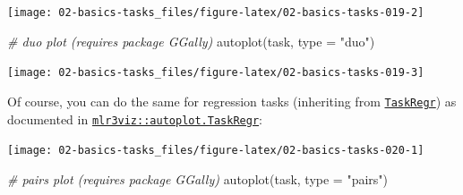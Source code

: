 \documentclass[
]{scrbook}
\newenvironment{Shaded}{\begin{snugshade}}{\end{snugshade}}
\newcommand{\AttributeTok}[1]{\textcolor[rgb]{0.77,0.63,0.00}{#1}}
\newcommand{\CommentTok}[1]{\textcolor[rgb]{0.56,0.35,0.01}{\textit{#1}}}
\newcommand{\DecValTok}[1]{\textcolor[rgb]{0.00,0.00,0.81}{#1}}
\newcommand{\FunctionTok}[1]{\textcolor[rgb]{0.00,0.00,0.00}{#1}}
\newcommand{\NormalTok}[1]{#1}
\newcommand{\OtherTok}[1]{\textcolor[rgb]{0.56,0.35,0.01}{#1}}
\newcommand{\SpecialCharTok}[1]{\textcolor[rgb]{0.00,0.00,0.00}{#1}}
\newcommand{\StringTok}[1]{\textcolor[rgb]{0.31,0.60,0.02}{#1}}
\renewenvironment{Shaded} {\begin{snugshade}\small} {\end{snugshade}}
\begin{document}
\begin{center}\texttt{[image: 02-basics-tasks\_files/figure-latex/02-basics-tasks-019-2]} \end{center}

\begin{Shaded}
\begin{Highlighting}[]
\CommentTok{\# duo plot (requires package GGally)}
\FunctionTok{autoplot}\NormalTok{(task, }\AttributeTok{type =} \StringTok{"duo"}\NormalTok{)}
\end{Highlighting}
\end{Shaded}

\begin{center}\texttt{[image: 02-basics-tasks\_files/figure-latex/02-basics-tasks-019-3]} \end{center}

Of course, you can do the same for regression tasks (inheriting from \href{https://mlr3.mlr-org.com/reference/TaskRegr.html}{\texttt{TaskRegr}}) as documented in \href{https://mlr3viz.mlr-org.com/reference/autoplot.TaskRegr.html}{\texttt{mlr3viz::autoplot.TaskRegr}}:

\begin{Shaded}
\end{Shaded}

\begin{center}\texttt{[image: 02-basics-tasks\_files/figure-latex/02-basics-tasks-020-1]} \end{center}

\begin{Shaded}
\begin{Highlighting}[]
\CommentTok{\# pairs plot (requires package GGally)}
\FunctionTok{autoplot}\NormalTok{(task, }\AttributeTok{type =} \StringTok{"pairs"}\NormalTok{)}
\end{Highlighting}
\end{Shaded}
\end{document}
